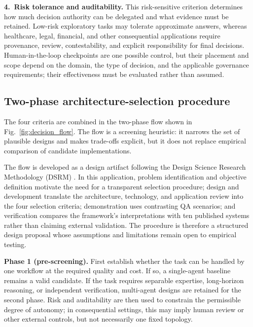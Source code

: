 \documentclass[a4paper,fleqn]{cas-dc}
\begin{document}
\textbf{4.\ Risk tolerance and auditability.} This risk-sensitive criterion
determines how much decision authority can be delegated and what evidence must
be retained. Low-risk exploratory tasks may tolerate approximate answers,
whereas healthcare, legal, financial, and other consequential applications
require provenance, review, contestability, and explicit responsibility for
final decisions. Human-in-the-loop checkpoints are one possible control, but
their placement and scope depend on the domain, the type of decision, and the
applicable governance requirements; their effectiveness must be evaluated
rather than assumed.

\subsection{Two-phase architecture-selection procedure}
\label{sec:two_phase}

The four criteria are combined in the two-phase flow shown in
Fig.~\ref{fig:decision_flow}. The flow is a screening heuristic: it narrows
the set of plausible designs and makes trade-offs explicit, but it does not
replace empirical comparison of candidate implementations.

The flow is developed as a design artifact following the Design Science
Research Methodology (DSRM) \citep{peffers2007dsrm}. In this application,
problem identification and objective definition motivate the need for a
transparent selection procedure; design and development translate the
architecture, technology, and application review into the four selection
criteria; demonstration uses contrasting QA scenarios; and verification
compares the framework's interpretations with ten published systems rather
than claiming external validation. The procedure is therefore a structured design
proposal whose assumptions and limitations remain open to empirical testing.

\textbf{Phase 1 (pre-screening).} First establish whether the task can be
handled by one workflow at the required quality and cost. If so, a single-agent
baseline remains a valid candidate. If the task requires separable expertise,
long-horizon reasoning, or independent verification, multi-agent designs are
retained for the second phase. Risk and auditability are then used to constrain
the permissible degree of autonomy; in consequential settings, this may imply
human review or other external controls, but not necessarily one fixed
topology.
\end{document}
